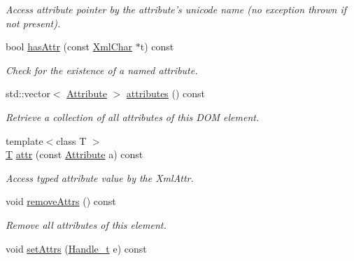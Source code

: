 \begin{DoxyCompactItemize}
\begin{DoxyCompactList}\small\item\em Access attribute pointer by the attribute's unicode name (no exception thrown if not present). \item\end{DoxyCompactList}\item 
bool \hyperlink{class_d_d4hep_1_1_x_m_l_1_1_handle__t_a9ff6d04709536147ed8637d85c294dde}{hasAttr} (const \hyperlink{namespace_d_d4hep_1_1_x_m_l_a09e5d9cc86ed782f6826dfe0778c1815}{XmlChar} $\ast$t) const 
\begin{DoxyCompactList}\small\item\em Check for the existence of a named attribute. \item\end{DoxyCompactList}\item 
std::vector$<$ \hyperlink{namespace_d_d4hep_1_1_x_m_l_a5c19b7116be99d69b4b22d911357baaf}{Attribute} $>$ \hyperlink{class_d_d4hep_1_1_x_m_l_1_1_handle__t_a85784c7411cdcf10e5601b1147dfdf46}{attributes} () const 
\begin{DoxyCompactList}\small\item\em Retrieve a collection of all attributes of this DOM element. \item\end{DoxyCompactList}\item 
{\footnotesize template$<$class T $>$ }\\\hyperlink{class_t}{T} \hyperlink{class_d_d4hep_1_1_x_m_l_1_1_handle__t_ae00b87295308c1b4d342cb7be2eb0679}{attr} (const \hyperlink{namespace_d_d4hep_1_1_x_m_l_a5c19b7116be99d69b4b22d911357baaf}{Attribute} a) const 
\begin{DoxyCompactList}\small\item\em Access typed attribute value by the XmlAttr. \item\end{DoxyCompactList}\item 
void \hyperlink{class_d_d4hep_1_1_x_m_l_1_1_handle__t_aba8a10226d5bea74d81f2eca83d0cc2c}{removeAttrs} () const 
\begin{DoxyCompactList}\small\item\em Remove all attributes of this element. \item\end{DoxyCompactList}\item 
void \hyperlink{class_d_d4hep_1_1_x_m_l_1_1_handle__t_a2e9ebb15715fabaa1b781bcf21ee3255}{setAttrs} (\hyperlink{class_d_d4hep_1_1_x_m_l_1_1_handle__t}{Handle\_\-t} e) const 

\end{DoxyCompactItemize}
